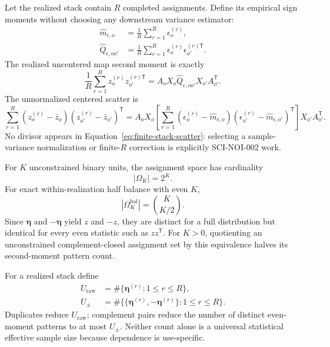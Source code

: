 \documentclass[11pt]{article}
\newcommand{\etaV}{\boldsymbol{\eta}}
\begin{document}
Let the realized stack contain $R$ completed assignments.  Define its
empirical sign moments without choosing any downstream variance estimator:
\begin{align}
  \widehat m_{\epsilon,o}
  &=\frac{1}{R}\sum_{r=1}^{R}\epsilon_o^{(r)},
  \label{eq:empirical-sign-mean}\\
  \widehat Q_{\epsilon,oo'}
  &=\frac{1}{R}\sum_{r=1}^{R}
    \epsilon_o^{(r)}\epsilon_{o'}^{(r)\mathsf T}.
  \label{eq:empirical-sign-correlation}
\end{align}
The realized uncentered map second moment is exactly
\begin{equation}
  \frac{1}{R}\sum_{r=1}^{R}z_o^{(r)}z_{o'}^{(r)\mathsf T}
  =A_oX_o\widehat Q_{\epsilon,oo'}X_{o'}A_{o'}^{\mathsf T}.
  \label{eq:finite-stack-second-moment}
\end{equation}
The unnormalized centered scatter is
\begin{equation}
  \sum_{r=1}^{R}(z_o^{(r)}-\bar z_o)
  (z_{o'}^{(r)}-\bar z_{o'})^{\mathsf T}
  =A_oX_o\!\left[
    \sum_{r=1}^{R}(\epsilon_o^{(r)}-\widehat m_{\epsilon,o})
    (\epsilon_{o'}^{(r)}-\widehat m_{\epsilon,o'})^{\mathsf T}
  \right]X_{o'}A_{o'}^{\mathsf T}.
  \label{eq:finite-stack-scatter}
\end{equation}
No divisor appears in Equation~\eqref{eq:finite-stack-scatter}: selecting a
sample-variance normalization or finite-$R$ correction is explicitly
SCI-NOI-002 work.

For $K$ unconstrained binary units, the assignment space has cardinality
\begin{equation}
  |\Omega_K|=2^K.
  \label{eq:assignment-cardinality}
\end{equation}
For exact within-realization half balance with even $K$,
\begin{equation}
  |\Omega_K^{\mathrm{bal}}|={K\choose K/2}.
  \label{eq:balanced-cardinality}
\end{equation}
Since $\etaV$ and $-\etaV$ yield $z$ and $-z$, they are distinct for a full
distribution but identical for every even statistic such as $zz^{\mathsf T}$.
For $K>0$, quotienting an unconstrained complement-closed assignment set by
this equivalence halves its second-moment pattern count.

For a realized stack define
\begin{align}
  U_{\mathrm{raw}}
  &=\#\{\etaV^{(r)}:1\le r\le R\},
  \label{eq:raw-unique-count}\\
  U_{\pm}
  &=\#\{\{\etaV^{(r)},-\etaV^{(r)}\}:1\le r\le R\}.
  \label{eq:complement-unique-count}
\end{align}
Duplicates reduce $U_{\mathrm{raw}}$; complement pairs reduce the number of
distinct even-moment patterns to at most $U_{\pm}$.  Neither count alone is a
universal statistical effective sample size because dependence is
use-specific.
\end{document}

